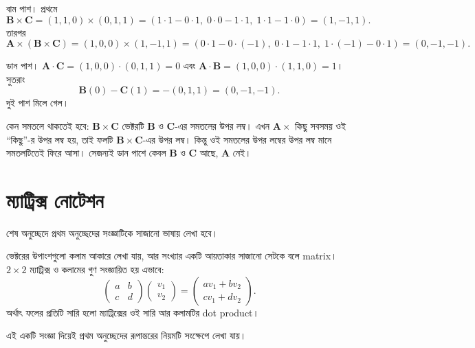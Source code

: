 \documentclass[11pt]{article}
\begin{document}
\begin{sol}
বাম পাশ। প্রথমে
\[
  \mathbf{B}\times\mathbf{C} = (1,1,0)\times(0,1,1)
  = \left( 1\cdot 1 - 0\cdot 1,\; 0\cdot 0 - 1\cdot 1,\;
  1\cdot 1 - 1\cdot 0 \right) = (1,-1,1) .
\]
তারপর
\[
  \mathbf{A}\times\left( \mathbf{B}\times\mathbf{C} \right)
  = (1,0,0)\times(1,-1,1)
  = \left( 0\cdot 1 - 0\cdot(-1),\; 0\cdot 1 - 1\cdot 1,\;
  1\cdot(-1) - 0\cdot 1 \right) = (0,-1,-1) .
\]

ডান পাশ। $\mathbf{A}\cdot\mathbf{C} = (1,0,0)\cdot(0,1,1) = 0$ এবং
$\mathbf{A}\cdot\mathbf{B} = (1,0,0)\cdot(1,1,0) = 1$। সুতরাং
\[
  \mathbf{B}(0) - \mathbf{C}(1) = -(0,1,1) = (0,-1,-1) .
\]
দুই পাশ মিলে গেল।

কেন সমতলে থাকতেই হবে: $\mathbf{B}\times\mathbf{C}$ ভেক্টরটি $\mathbf{B}$ ও
$\mathbf{C}$-এর সমতলের উপর লম্ব। এখন $\mathbf{A}\times$ কিছু সবসময় ওই
``কিছু''-র উপর লম্ব হয়, তাই ফলটি $\mathbf{B}\times\mathbf{C}$-এর উপর লম্ব।
কিন্তু ওই সমতলের উপর লম্বের উপর লম্ব মানে সমতলটিতেই ফিরে আসা। সেজন্যই ডান
পাশে কেবল $\mathbf{B}$ ও $\mathbf{C}$ আছে, $\mathbf{A}$ নেই।
\end{sol}

\section{ম্যাট্রিক্স নোটেশন}

শেষ অনুচ্ছেদে প্রথম অনুচ্ছেদের সংজ্ঞাটিকে সাজানো ভাষায় লেখা হবে।

\begin{idea}[কলাম ভেক্টর ও ম্যাট্রিক্স]
ভেক্টরের উপাংশগুলো কলাম আকারে লেখা যায়, আর সংখ্যার একটি আয়তাকার সাজানো
সেটকে বলে matrix। $2\times 2$ ম্যাট্রিক্স ও কলামের গুণ সংজ্ঞায়িত হয় এভাবে:
\[
  \begin{pmatrix} a & b \\ c & d \end{pmatrix}
  \begin{pmatrix} v_{1} \\ v_{2} \end{pmatrix}
  = \begin{pmatrix} av_{1}+bv_{2} \\ cv_{1}+dv_{2} \end{pmatrix} .
\]
অর্থাৎ ফলের প্রতিটি সারি হলো ম্যাট্রিক্সের ওই সারি আর কলামটির dot product।
\end{idea}

এই একটি সংজ্ঞা দিয়েই প্রথম অনুচ্ছেদের রূপান্তরের নিয়মটি সংক্ষেপে লেখা যায়।
\end{document}

